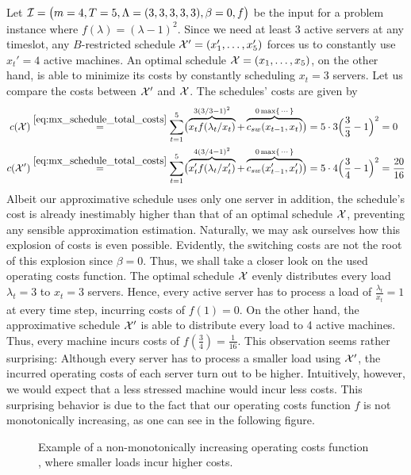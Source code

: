 \begin{exmpl}
Let $\mathcal{I}=\bigl(m=4,T=5,\Lambda=(3,3,3,3,3),\beta=0,f\bigr)$ be the input for a problem instance where $f(\lambda)=(\lambda-1)^2$. Since we need at least 3 active servers at any timeslot, any $B$-restricted schedule $\mathcal{X}'=(x_1',\dotsc,x_5')$ forces us to constantly use $x_t'=4$ active machines. An optimal schedule $\mathcal{X}=(x_1,\dotsc,x_5)$, on the other hand, is able to minimize its costs by constantly scheduling $x_t=3$ servers. Let us compare the costs between $\mathcal{X}'$ and $\mathcal{X}$. The schedules' costs are given by
\begin{align*}
	c(\mathcal{X})&\stackrel{\eqref{eq:mx_schedule_total_costs}}{=}\sum\limits_{t=1}^{5}\bigl(\overbrace{x_tf(\lambda_t/x_t)}^{3(3/3-1)^2}+\overbrace{c_{sw}(x_{t-1},x_t)}^{0\max\{\,\cdots\}}\bigr)=5\cdot3\Bigl(\frac{3}{3}-1\Bigr)^2=0\\
	c(\mathcal{X}')&\stackrel{\eqref{eq:mx_schedule_total_costs}}{=}\sum\limits_{t=1}^{5}\bigl(\overbrace{x_t'f(\lambda_t/x_t')}^{4(3/4-1)^2}+\overbrace{c_{sw}(x_{t-1}',x_t')}^{0\max\{\,\cdots\}}\bigr)=5\cdot4\Bigl(\frac{3}{4}-1\Bigr)^2=\frac{20}{16} 
\end{align*}
Albeit our approximative schedule uses only one server in addition, the schedule's cost is already inestimably higher than that of an optimal schedule $\mathcal{X}$, preventing any sensible approximation estimation. Naturally, we may ask ourselves how this explosion of costs is even possible. Evidently, the switching costs are not the root of this explosion since $\beta=0$. Thus, we shall take a closer look on the used operating costs function. The optimal schedule $\mathcal{X}$ evenly distributes every load $\lambda_t=3$ to $x_t=3$ servers. Hence, every active server has to process a load of $\frac{\lambda_t}{x_t}=1$ at every time step, incurring costs of $f(1)=0$. On the other hand, the approximative schedule $\mathcal{X}'$ is able to distribute every load to 4 active machines. Thus, every machine incurs costs of $f(\frac{3}{4})=\frac{1}{16}$. This observation seems rather surprising: Although every server has to process a smaller load using $\mathcal{X}'$, the incurred operating costs of each server turn out to be higher. Intuitively, however, we would expect that a less stressed machine would incur less costs. This surprising behavior is due to the fact that our operating costs function $f$ is not monotonically increasing, as one can see in the following figure.
\begin{figure}[H]
\centering

\caption{Example of a non-monotonically increasing operating costs function , where smaller loads incur higher costs.}
\label{fig:non_mono_incr_f}
\end{figure}
\end{exmpl}
